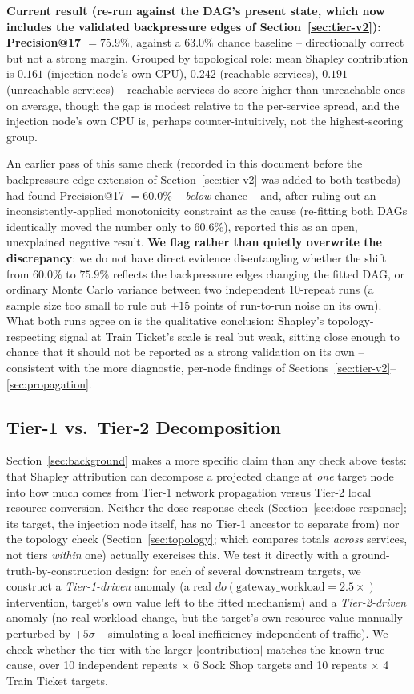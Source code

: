 \documentclass[journal, 10pt]{IEEEtran}
\begin{document}
\textbf{Current result (re-run against the DAG's present state, which now includes the validated backpressure edges of Section~\ref{sec:tier-v2}): Precision@17 $= 75.9\%$}, against a $63.0\%$ chance baseline -- directionally correct but not a strong margin. Grouped by topological role: mean Shapley contribution is $0.161$ (injection node's own CPU), $0.242$ (reachable services), $0.191$ (unreachable services) -- reachable services do score higher than unreachable ones on average, though the gap is modest relative to the per-service spread, and the injection node's own CPU is, perhaps counter-intuitively, not the highest-scoring group.

An earlier pass of this same check (recorded in this document before the backpressure-edge extension of Section~\ref{sec:tier-v2} was added to both testbeds) had found Precision@17 $=60.0\%$ -- \emph{below} chance -- and, after ruling out an inconsistently-applied monotonicity constraint as the cause (re-fitting both DAGs identically moved the number only to $60.6\%$), reported this as an open, unexplained negative result. \textbf{We flag rather than quietly overwrite the discrepancy}: we do not have direct evidence disentangling whether the shift from $60.0\%$ to $75.9\%$ reflects the backpressure edges changing the fitted DAG, or ordinary Monte Carlo variance between two independent 10-repeat runs (a sample size too small to rule out $\pm15$ points of run-to-run noise on its own). What both runs agree on is the qualitative conclusion: Shapley's topology-respecting signal at Train Ticket's scale is real but weak, sitting close enough to chance that it should not be reported as a strong validation on its own -- consistent with the more diagnostic, per-node findings of Sections~\ref{sec:tier-v2}--\ref{sec:propagation}.

\subsection{Tier-1 vs.\ Tier-2 Decomposition}
\label{sec:tier}
Section~\ref{sec:background} makes a more specific claim than any check above tests: that Shapley attribution can decompose a projected change at \emph{one} target node into how much comes from Tier-1 network propagation versus Tier-2 local resource conversion. Neither the dose-response check (Section~\ref{sec:dose-response}; its target, the injection node itself, has no Tier-1 ancestor to separate from) nor the topology check (Section~\ref{sec:topology}; which compares totals \emph{across} services, not tiers \emph{within} one) actually exercises this. We test it directly with a ground-truth-by-construction design: for each of several downstream targets, we construct a \emph{Tier-1-driven} anomaly (a real $do(\text{gateway\_workload} = 2.5\times)$ intervention, target's own value left to the fitted mechanism) and a \emph{Tier-2-driven} anomaly (no real workload change, but the target's own resource value manually perturbed by $+5\sigma$ -- simulating a local inefficiency independent of traffic). We check whether the tier with the larger $|{\text{contribution}}|$ matches the known true cause, over 10 independent repeats $\times$ 6 Sock Shop targets and 10 repeats $\times$ 4 Train Ticket targets.
\end{document}
